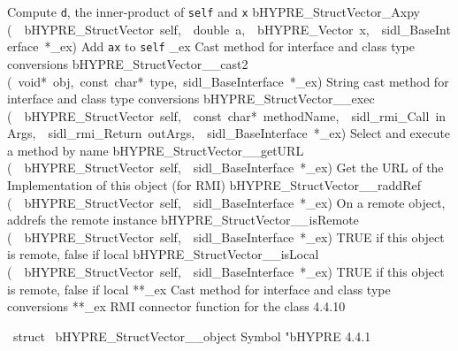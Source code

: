 \documentclass{article}
\begin{document}
\begin{cxxentry}
\begin{cxxentry}
\begin{cxxnames}
{Compute {\tt d}, the inner-product of {\tt self} and {\tt x}}
        {}
\label{cxx.4.4.20}
        {bHYPRE\_StructVector\_Axpy}
        {(\ \ bHYPRE\_StructVector\ self,\ \ double\ a,\ \ bHYPRE\_Vector\ x,\ \ sidl\_BaseInterface\ *\_ex)}
        {
Add {\tt a}{\tt x} to {\tt self}}
        {}
\label{cxx.4.4.21}
        {\_ex}
        {}
        {
Cast method for interface and class type conversions}
        {}
\label{cxx.4.4.22}
        {bHYPRE\_StructVector\_\_cast2}
        {(\ void*\ obj,\ const\ char*\ type,\ sidl\_BaseInterface\ *\_ex)}
        {
String cast method for interface and class type conversions}
        {}
\label{cxx.4.4.23}
        {bHYPRE\_StructVector\_\_exec}
        {(\ \ bHYPRE\_StructVector\ self,\ \ const\ char*\ methodName,\ \ sidl\_rmi\_Call\ inArgs,\ \ sidl\_rmi\_Return\ outArgs,\ \ sidl\_BaseInterface\ *\_ex)}
        {
Select and execute a method by name}
        {}
\label{cxx.4.4.24}
        {bHYPRE\_StructVector\_\_getURL}
        {(\ \ bHYPRE\_StructVector\ self,\ \ sidl\_BaseInterface\ *\_ex)}
        {
Get the URL of the Implementation of this object (for RMI)}
        {}
\label{cxx.4.4.25}
        {bHYPRE\_StructVector\_\_raddRef}
        {(\ \ bHYPRE\_StructVector\ self,\ \ sidl\_BaseInterface\ *\_ex)}
        {
On a remote object, addrefs the remote instance}
        {}
\label{cxx.4.4.26}
        {bHYPRE\_StructVector\_\_isRemote}
        {(\ \ bHYPRE\_StructVector\ self,\ \ sidl\_BaseInterface\ *\_ex)}
        {
TRUE if this object is remote, false if local}
        {}
\label{cxx.4.4.27}
        {bHYPRE\_StructVector\_\_isLocal}
        {(\ \ bHYPRE\_StructVector\ self,\ \ sidl\_BaseInterface\ *\_ex)}
        {
TRUE if this object is remote, false if local}
        {}
\label{cxx.4.4.28}
        {**\_ex}
        {}
        {
Cast method for interface and class type conversions}
        {}
\label{cxx.4.4.29}
        {**\_ex}
        {}
        {
RMI connector function for the class}
        {4.4.10}
\end{cxxnames}
\begin{cxxvariable}
{\ struct\ }
        {bHYPRE\_StructVector\_\_object}
        {}
        {
Symbol "bHYPRE}
        {4.4.1}
\begin{cxxdoc}


\end{cxxdoc}
\end{cxxvariable}
\end{cxxentry}
\end{cxxentry}
\end{document}
